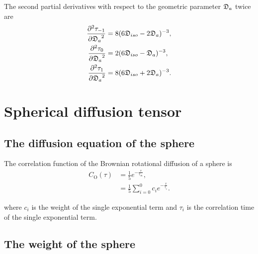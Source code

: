 The second partial derivatives with respect to the geometric parameter $\mathfrak{D}_a$ twice are
\begin{subequations}
\begin{align}
    \frac{\partial^2 \tau_{-1}}{{\partial \mathfrak{D}_a}^2} &= 8 (6\mathfrak{D}_{iso} - 2\mathfrak{D}_a)^{-3}, \\
    \frac{\partial^2 \tau_{0}}{{\partial \mathfrak{D}_a}^2}  &= 2 (6\mathfrak{D}_{iso} - \mathfrak{D}_a)^{-3}, \\
    \frac{\partial^2 \tau_{1}}{{\partial \mathfrak{D}_a}^2}  &= 8 (6\mathfrak{D}_{iso} + 2\mathfrak{D}_a)^{-3}.
\end{align}
\end{subequations}





\newpage
\section{Spherical diffusion tensor}





\subsection{The diffusion equation of the sphere} \label{sphere equation}

The correlation function of the Brownian rotational diffusion of a sphere is
\begin{align} \label{eq: spherical correlation function}
    C_\mathrm{O}(\tau) &= \frac{1}{5} e^{-\frac{\tau}{\tau_m}}, \\
              &= \frac{1}{5} \sum^0_{i=0} c_i e^{-\frac{\tau}{\tau_i}}.
\end{align}

\noindent where $c_i$ is the weight of the single exponential term and $\tau_i$ is the correlation time of the single exponential term.




\subsection{The weight of the sphere}


